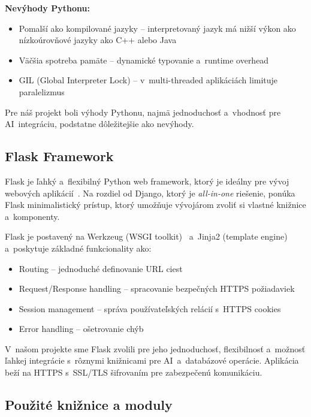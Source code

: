         \textbf{Nevýhody Pythonu:}

\begin{itemize}
  \item Pomalší ako kompilované jazyky -- interpretovaný jazyk má nižší výkon ako
        nízkoúrovňové jazyky ako C++ alebo Java
  \item Väčšia spotreba pamäte -- dynamické typovanie a~runtime overhead
  \item GIL (Global Interpreter Lock) -- v~multi-threaded aplikáciách limituje paralelizmus
\end{itemize}

        Pre náš projekt boli výhody Pythonu, najmä jednoduchosť a~vhodnosť pre AI~integráciu,
podstatne dôležitejšie ako nevýhody.

\subsection{Flask Framework}

        Flask je ľahký a~flexibilný Python web framework, ktorý je ideálny pre vývoj
webových aplikácií~\cite{flask_docs}. Na rozdiel od Django, ktorý je \emph{all-in-one} riešenie, ponúka Flask
minimalistický prístup, ktorý umožňuje vývojárom zvoliť si vlastné knižnice a~komponenty.

        Flask je postavený na Werkzeug (WSGI toolkit)~\cite{werkzeug_docs} a~Jinja2 (template engine)~\cite{jinja2_docs} a~poskytuje
základné funkcionality ako:

\begin{itemize}
  \item Routing -- jednoduché definovanie URL ciest
  \item Request/Response handling -- spracovanie bezpečných HTTPS požiadaviek
  \item Session management -- správa používateľských relácií s~HTTPS cookies
  \item Error handling -- ošetrovanie chýb
\end{itemize}

        V~našom projekte sme Flask zvolili pre jeho jednoduchosť, flexibilnosť a~možnosť
ľahkej integrácie s~rôznymi knižnicami pre AI~a~databázové operácie. Aplikácia beží
na HTTPS s~SSL/TLS šifrovaním pre zabezpečenú komunikáciu.

\subsection{Použité knižnice a moduly}


